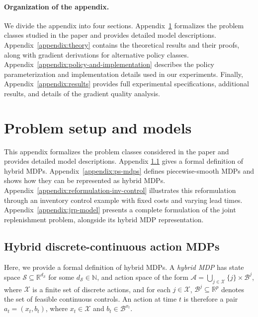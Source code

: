 \documentclass{article}
\theoremstyle{definition}
\theoremstyle{remark}
\begin{document}
\newpage

\appendix


\paragraph{Organization of the appendix.}
We divide the appendix into four sections.
Appendix~\ref{appendix:problem-and-models} formalizes the problem classes studied in the paper and provides detailed model descriptions. Appendix~\ref{appendix:theory} contains the theoretical results and their proofs, along with gradient derivations for alternative policy classes. Appendix~\ref{appendix:policy-and-implementation} describes the policy parameterization and implementation details used in our experiments. Finally, Appendix~\ref{appendix:results} provides full experimental specifications, additional results, and details of the gradient quality analysis.


\section{Problem setup and models}
\label{appendix:problem-and-models}

This appendix formalizes the problem classes considered in the paper and provides detailed model descriptions. Appendix \ref{appendix:hybrid-mdps} gives a formal definition of hybrid MDPs. Appendix~\ref{appendix:ps-mdps} defines piecewise-smooth MDPs and shows how they can be represented as hybrid MDPs. Appendix~\ref{appendix:reformulation-inv-control} illustrates this reformulation through an inventory control example with fixed costs and varying lead times. Appendix~\ref{appendix:jrp-model} presents a complete formulation of the joint replenishment problem, alongside its hybrid MDP representation.

\subsection{Hybrid discrete-continuous action MDPs}
\label{appendix:hybrid-mdps}

Here, we provide a formal definition of hybrid MDPs.
A \textit{hybrid MDP} has state space 
$\mathcal{S} \subseteq \mathbb{R}^{d_{\mathcal S}}$ for some $d_{\mathcal S} \in \mathbb{N}$, 
and action space of the form
$\mathcal{A} = \bigcup_{j \in \mathcal{X}} \{j\} \times \mathcal{B}^j$,
where $\mathcal{X}$ is a finite set of discrete actions, and for each $j \in \mathcal{X}$, 
$\mathcal{B}^j \subseteq \mathbb{R}^{p}$ denotes the set of feasible continuous controls. 
An action at time $t$ is therefore a pair $a_t = (x_t, b_t)$, 
where $x_t \in \mathcal{X}$ and $b_t \in \mathcal{B}^{x_t}$.
\end{document}
